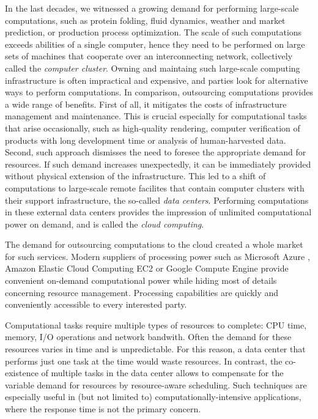 \indent
In the last decades, we witnessed a growing demand for performing large-scale
computations, such as protein folding, fluid dynamics, weather and market prediction, or production process optimization.
The scale of such computations exceeds abilities of a single computer, hence they need to be performed on large sets of machines that cooperate over an interconnecting network, collectively called the \emph{computer cluster}.
Owning and maintaing such large-scale computing infrastructure is often impractical and expensive, and parties look for alternative ways to perform computations.
In comparison, outsourcing computations provides a wide range of benefits.
First of all, it mitigates the costs of infrastructure management and maintenance.
This is crucial especially for computational tasks that arise occasionally, such as high-quality rendering, computer verification of products with long development time or analysis of human-harvested data.
Second, such approach dismisses the need to foresee the appropriate demand for resources.
If such demand increases unexpectedly, it can be immediately provided without physical extension of the infrastructure.
This led to a shift of computations to large-scale remote facilites that contain computer clusters with their support infrastructure, the so-called \emph{data centers}.
Performing computations in these external data centers provides the impression of unlimited computational power on demand, and is called the \emph{cloud computing}.

The demand for outsourcing computations to the cloud created a whole market for such services.
Modern suppliers of processing power such as Microsoft Azure \cite{url-azure}, Amazon Elastic Cloud Computing EC2 \cite{url-amazon-ec2} or Google Compute Engine \cite{url-gce} provide convenient on-demand computational power while hiding most of details concerning resource management.
Processing capabilities are quickly and conveniently accessible to every interested party.

Computational tasks require multiple types of resources to complete: CPU time, memory, I/O operations and network bandwith.
Often the demand for these resources varies in time and is unpredictable.
For this reason, a data center that performs just one task at the time would waste resources.
In contrast, the co-existence of multiple tasks in the data center allows to compensate for the variable demand for resources by resource-aware scheduling.
Such techniques are especially useful in (but not limited to) computationally-intensive applications, where the response time is not the primary concern.

